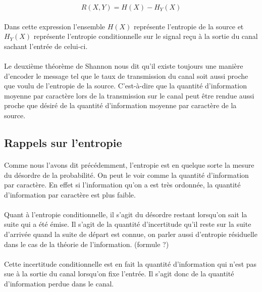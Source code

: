 	\[R(X,Y)=H(X)-H_Y(X)\]
	
	\paragraph{}
	Dans cette expression l'ensemble $H(X)$ représente l'entropie de la
	source et $H_Y(X)$ représente l'entropie conditionnelle sur le signal
	reçu à la sortie du canal sachant l'entrée de celui-ci. 
	
	\paragraph{}
	Le deuxième théorème de Shannon nous dit qu'il existe toujours une 
	manière d'encoder le message tel que le taux de transmission du canal
	soit aussi proche que voulu de l'entropie de la source. C'est-à-dire
	que la quantité d'information moyenne par caractère lors de la 
	transmission sur le canal peut être rendue aussi proche que désiré de 
	la quantité d'information moyenne par caractère de la source.
	
\subsection*{Rappels sur l'entropie}

	\paragraph{}
	Comme nous l'avons dit précédemment, l'entropie est en quelque sorte
	la mesure du désordre de la probabilité. On peut le voir comme la 
	quantité d'information par caractère. En effet si l'information qu'on 
	a est très ordonnée, la quantité d'information par caractère est plus
	faible.
	
	\paragraph{}
	Quant à l'entropie conditionnelle, il s'agit du désordre restant
	lorsqu'on sait la suite qui a été émise. Il s'agit de la quantité
	d'incertitude qu'il reste sur la suite d'arrivée quand la suite
	de départ est connue, on parler aussi d'entropie résiduelle dans le 
	cas de la théorie de l'information. (formule ?)
	
	\paragraph{}
	Cette incertitude conditionnelle est en fait la quantité d'information
	qui n'est pas sue à la sortie du canal lorsqu'on fixe l'entrée. Il 
	s'agit donc de la quantité d'information perdue dans le canal.
	
